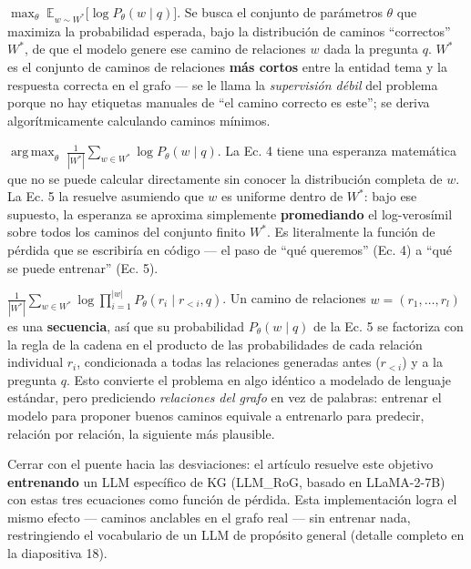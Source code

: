 \documentclass[11pt]{article}
\begin{document}
\begin{description}[leftmargin=1.2em]
  \item[Ecuación 4 --- el objetivo ideal.]
    $\displaystyle\max_\theta \; \mathbb{E}_{w \sim W^{*}}\big[\log P_\theta(w \mid q)\big]$.
    Se busca el conjunto de parámetros $\theta$ que maximiza la probabilidad esperada, bajo
    la distribución de caminos ``correctos'' $W^{*}$, de que el modelo genere ese camino de
    relaciones $w$ dada la pregunta $q$. $W^{*}$ es el conjunto de caminos de relaciones
    \textbf{más cortos} entre la entidad tema y la respuesta correcta en el grafo --- se le
    llama la \emph{supervisión débil} del problema porque no hay etiquetas manuales de
    ``el camino correcto es este''; se deriva algorítmicamente calculando caminos mínimos.
  \item[Ecuación 5 --- la versión computable.]
    $\displaystyle\operatorname*{arg\,max}_\theta \; \frac{1}{|W^{*}|} \sum_{w \in W^{*}} \log P_\theta(w \mid q)$.
    La Ec. 4 tiene una esperanza matemática que no se puede calcular directamente sin
    conocer la distribución completa de $w$. La Ec. 5 la resuelve asumiendo que $w$ es
    uniforme dentro de $W^{*}$: bajo ese supuesto, la esperanza se aproxima simplemente
    \textbf{promediando} el log-verosímil sobre todos los caminos del conjunto finito
    $W^{*}$. Es literalmente la función de pérdida que se escribiría en código --- el paso
    de ``qué queremos'' (Ec. 4) a ``qué se puede entrenar'' (Ec. 5).
  \item[Ecuación 6 --- la descomposición práctica.]
    $\displaystyle\frac{1}{|W^{*}|} \sum_{w \in W^{*}} \log \prod_{i=1}^{|w|} P_\theta(r_i \mid r_{<i}, q)$.
    Un camino de relaciones $w=(r_1,\dots,r_l)$ es una \textbf{secuencia}, así que su
    probabilidad $P_\theta(w\mid q)$ de la Ec. 5 se factoriza con la regla de la cadena en
    el producto de las probabilidades de cada relación individual $r_i$, condicionada a
    todas las relaciones generadas antes ($r_{<i}$) y a la pregunta $q$. Esto convierte el
    problema en algo idéntico a modelado de lenguaje estándar, pero prediciendo
    \emph{relaciones del grafo} en vez de palabras: entrenar el modelo para proponer buenos
    caminos equivale a entrenarlo para predecir, relación por relación, la siguiente más
    plausible.
\end{description}

Cerrar con el puente hacia las desviaciones: el artículo resuelve este objetivo
\textbf{entrenando} un LLM específico de KG (LLM\_RoG, basado en LLaMA-2-7B) con estas tres
ecuaciones como función de pérdida. Esta implementación logra el mismo efecto --- caminos
anclables en el grafo real --- sin entrenar nada, restringiendo el vocabulario de un LLM de
propósito general (detalle completo en la diapositiva 18).
\end{document}
